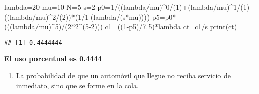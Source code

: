 \documentclass[
]{article}
\newenvironment{Shaded}{\begin{snugshade}}{\end{snugshade}}
\newcommand{\DecValTok}[1]{\textcolor[rgb]{0.00,0.00,0.81}{#1}}
\newcommand{\FloatTok}[1]{\textcolor[rgb]{0.00,0.00,0.81}{#1}}
\newcommand{\FunctionTok}[1]{\textcolor[rgb]{0.00,0.00,0.00}{#1}}
\newcommand{\NormalTok}[1]{#1}
\newcommand{\OtherTok}[1]{\textcolor[rgb]{0.56,0.35,0.01}{#1}}
\newcommand{\SpecialCharTok}[1]{\textcolor[rgb]{0.00,0.00,0.00}{#1}}
\providecommand{\tightlist}{%
  \setlength{\itemsep}{0pt}\setlength{\parskip}{0pt}}
\begin{document}
\begin{Shaded}
\begin{Highlighting}[]
\NormalTok{lambda}\OtherTok{=}\DecValTok{20}
\NormalTok{mu}\OtherTok{=}\DecValTok{10}
\NormalTok{N}\OtherTok{=}\DecValTok{5}
\NormalTok{s}\OtherTok{=}\DecValTok{2}
\NormalTok{p0}\OtherTok{=}\DecValTok{1}\SpecialCharTok{/}\NormalTok{((lambda}\SpecialCharTok{/}\NormalTok{mu)}\SpecialCharTok{\^{}}\DecValTok{0}\SpecialCharTok{/}\NormalTok{(}\DecValTok{1}\NormalTok{)}\SpecialCharTok{+}\NormalTok{(lambda}\SpecialCharTok{/}\NormalTok{mu)}\SpecialCharTok{\^{}}\DecValTok{1}\SpecialCharTok{/}\NormalTok{(}\DecValTok{1}\NormalTok{)}\SpecialCharTok{+}\NormalTok{((lambda}\SpecialCharTok{/}\NormalTok{mu)}\SpecialCharTok{\^{}}\DecValTok{2}\SpecialCharTok{/}\NormalTok{(}\DecValTok{2}\NormalTok{))}\SpecialCharTok{*}\NormalTok{(}\DecValTok{1}\SpecialCharTok{/}\DecValTok{1}\SpecialCharTok{{-}}\NormalTok{(lambda}\SpecialCharTok{/}\NormalTok{(s}\SpecialCharTok{*}\NormalTok{mu))))}
\NormalTok{p5}\OtherTok{=}\NormalTok{p0}\SpecialCharTok{*}\NormalTok{(((lambda}\SpecialCharTok{/}\NormalTok{mu)}\SpecialCharTok{\^{}}\DecValTok{5}\NormalTok{)}\SpecialCharTok{/}\NormalTok{(}\DecValTok{2}\SpecialCharTok{*}\DecValTok{2}\SpecialCharTok{\^{}}\NormalTok{(}\DecValTok{5{-}2}\NormalTok{)))}
\NormalTok{c1}\OtherTok{=}\NormalTok{((}\DecValTok{1}\SpecialCharTok{{-}}\NormalTok{p5)}\SpecialCharTok{/}\FloatTok{7.5}\NormalTok{)}\SpecialCharTok{*}\NormalTok{lambda}
\NormalTok{ct}\OtherTok{=}\NormalTok{c1}\SpecialCharTok{/}\NormalTok{s}
\FunctionTok{print}\NormalTok{(ct)}
\end{Highlighting}
\end{Shaded}

\begin{verbatim}
## [1] 0.4444444
\end{verbatim}

\textbf{El uso porcentual es 0.4444}

\begin{enumerate}
\def\labelenumi{\alph{enumi})}
\setcounter{enumi}{3}
\tightlist
\item
  La probabilidad de que un automóvil que llegue no reciba servicio de
  inmediato, sino que se forme en la cola.
\end{enumerate}
\end{document}
